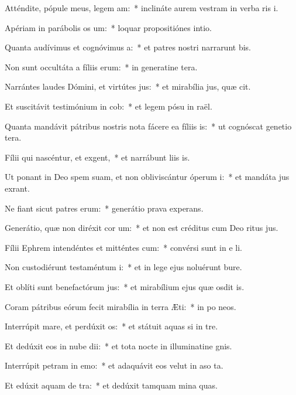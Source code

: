 \item Atténdite, pópule meus, legem am:~* inclináte aurem vestram in verba ris i.
\item Apériam in parábolis os um:~* loquar propositiónes  intio.
\item Quanta audívimus et cognóvimus a:~* et patres nostri narrarunt bis.
\item Non sunt occultáta a fíliis erum:~* in generatine tera.
\item Narrántes laudes Dómini, et virtútes jus:~* et mirabília jus, quæ cit.
\item Et suscitávit testimónium in cob:~* et legem pósu in raël.
\item Quanta mandávit pátribus nostris nota fácere ea fíliis is:~* ut cognóscat genetio tera.
\item Fílii qui nascéntur, et exgent,~* et narrábunt liis is.
\item Ut ponant in Deo spem suam, et non obliviscántur óperum i:~* et mandáta jus exrant.
\item Ne fiant sicut patres erum:~* generátio prava  experans.
\item Generátio, quæ non diréxit cor um:~* et non est créditus cum Deo ritus jus.
\item Fílii Ephrem intendéntes et mitténtes cum:~* convérsi sunt in e li.
\item Non custodiérunt testaméntum i:~* et in lege ejus noluérunt bure.
\item Et oblíti sunt benefactórum jus:~* et mirabílium ejus quæ osdit is.
\item Coram pátribus eórum fecit mirabília in terra Æti:~* in po neos.
\item Interrúpit mare, et perdúxit os:~* et státuit aquas si in tre.
\item Et dedúxit eos in nube dii:~* et tota nocte in illuminatine gnis.
\item Interrúpit petram in emo:~* et adaquávit eos velut in aso ta.
\item Et edúxit aquam de tra:~* et dedúxit tamquam mina quas.
